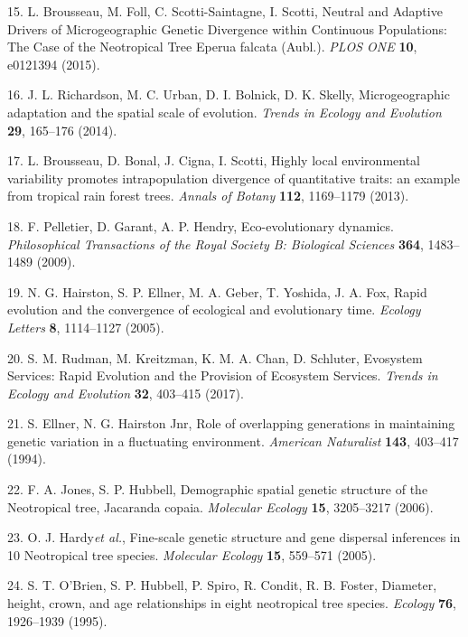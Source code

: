 \documentclass[
]{article}
\begin{document}
\leavevmode\hypertarget{ref-Brousseau2015}{}%
15. L. Brousseau, M. Foll, C. Scotti-Saintagne, I. Scotti, Neutral and Adaptive Drivers of Microgeographic Genetic Divergence within Continuous Populations: The Case of the Neotropical Tree Eperua falcata (Aubl.). \emph{PLOS ONE} \textbf{10}, e0121394 (2015).

\leavevmode\hypertarget{ref-Richardson2014}{}%
16. J. L. Richardson, M. C. Urban, D. I. Bolnick, D. K. Skelly, Microgeographic adaptation and the spatial scale of evolution. \emph{Trends in Ecology and Evolution} \textbf{29}, 165--176 (2014).

\leavevmode\hypertarget{ref-Team2013}{}%
17. L. Brousseau, D. Bonal, J. Cigna, I. Scotti, Highly local environmental variability promotes intrapopulation divergence of quantitative traits: an example from tropical rain forest trees. \emph{Annals of Botany} \textbf{112}, 1169--1179 (2013).

\leavevmode\hypertarget{ref-Pelletier2009}{}%
18. F. Pelletier, D. Garant, A. P. Hendry, Eco-evolutionary dynamics. \emph{Philosophical Transactions of the Royal Society B: Biological Sciences} \textbf{364}, 1483--1489 (2009).

\leavevmode\hypertarget{ref-Hairston2005}{}%
19. N. G. Hairston, S. P. Ellner, M. A. Geber, T. Yoshida, J. A. Fox, Rapid evolution and the convergence of ecological and evolutionary time. \emph{Ecology Letters} \textbf{8}, 1114--1127 (2005).

\leavevmode\hypertarget{ref-Rudman2017}{}%
20. S. M. Rudman, M. Kreitzman, K. M. A. Chan, D. Schluter, Evosystem Services: Rapid Evolution and the Provision of Ecosystem Services. \emph{Trends in Ecology and Evolution} \textbf{32}, 403--415 (2017).

\leavevmode\hypertarget{ref-Ellner1994}{}%
21. S. Ellner, N. G. Hairston Jnr, Role of overlapping generations in maintaining genetic variation in a fluctuating environment. \emph{American Naturalist} \textbf{143}, 403--417 (1994).

\leavevmode\hypertarget{ref-Jones2006}{}%
22. F. A. Jones, S. P. Hubbell, Demographic spatial genetic structure of the Neotropical tree, Jacaranda copaia. \emph{Molecular Ecology} \textbf{15}, 3205--3217 (2006).

\leavevmode\hypertarget{ref-Hardy2006}{}%
23. O. J. Hardy\emph{et al.}, Fine-scale genetic structure and gene dispersal inferences in 10 Neotropical tree species. \emph{Molecular Ecology} \textbf{15}, 559--571 (2005).

\leavevmode\hypertarget{ref-OBrien1995}{}%
24. S. T. O'Brien, S. P. Hubbell, P. Spiro, R. Condit, R. B. Foster, Diameter, height, crown, and age relationships in eight neotropical tree species. \emph{Ecology} \textbf{76}, 1926--1939 (1995).
\end{document}
